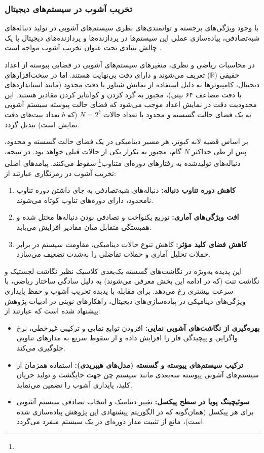 \subsubsection{تخریب آشوب در سیستم‌های دیجیتال}

با وجود ویژگی‌های برجسته و توانمندی‌های نظری سیستم‌های آشوبی در تولید دنباله‌های شبه‌تصادفی، پیاده‌سازی عملی این سیستم‌ها در پردازنده‌ها و پردازنده‌های دیجیتال با یک چالش بنیادی تحت عنوان تخریب آشوب مواجه است \cite{ref5, ref19}. 

در محاسبات ریاضی و نظری، متغیرهای سیستم‌های آشوبی در فضایی پیوسته از اعداد حقیقی ($\mathbb{R}$) تعریف می‌شوند و دارای دقت بی‌نهایت هستند. اما در سخت‌افزارهای دیجیتال، کامپیوترها به دلیل استفاده از نمایش شناور با دقت محدود (مانند استانداردهای  با دقت مضاعف ۶۴ بیتی)، مجبور به گرد کردن و کوانتایز کردن مقادیر هستند. این محدودیت دقت در نمایش اعداد موجب می‌شود که فضای حالت پیوسته سیستم آشوبی به یک فضای حالت گسسته و محدود با تعداد حالات $N=2^b$ (که $b$ تعداد بیت‌های دقت نمایش است) تبدیل گردد.

بر اساس قضیه لانه کبوتر، هر مسیر دینامیکی در یک فضای حالت گسسته و محدود، پس از طی حداکثر $N$ گام، مجبور به تکرار یکی از حالات قبلی خواهد بود. در نتیجه، دنباله‌های تولیدشده به رفتارهای دوره‌ای متناوب\footnote{} سقوط می‌کنند. پیامدهای اصلی تخریب آشوب در رمزنگاری عبارتند از:
\begin{enumerate}
    \item \textbf{کاهش دوره تناوب دنباله:} دنباله‌های شبه‌تصادفی به جای داشتن دوره تناوب نامحدود، دارای دوره‌های تناوب کوتاه می‌شوند.
    \item \textbf{افت ویژگی‌های آماری:} توزیع یکنواخت و تصادفی بودن دنباله‌ها مختل شده و همبستگی متقابل میان مقادیر افزایش می‌یابد.
    \item \textbf{کاهش فضای کلید مؤثر:} کاهش تنوع حالات دینامیکی، مقاومت سیستم در برابر حملات تحلیل آماری و حملات تفاضلی را به‌شدت تضعیف می‌سازد.
\end{enumerate}

این پدیده به‌ویژه در نگاشت‌های گسسته یک‌بعدی کلاسیک نظیر نگاشت لجستیک و نگاشت تنت (که در ادامه این بخش معرفی می‌شوند) به دلیل سادگی ساختار ریاضی، با سرعت بیشتری رخ می‌دهد. برای مقابله با پدیده تخریب آشوب و حفظ پایداری ویژگی‌های دینامیکی در پیاده‌سازی‌های دیجیتال، راهکارهای نوینی در ادبیات پژوهش پیشنهاد شده است که عبارتند از:
\begin{itemize}
    \item \textbf{بهره‌گیری از نگاشت‌های آشوبی نمایی:} افزودن توابع نمایی و ترکیبی غیرخطی، نرخ واگرایی و پیچیدگی فاز را افزایش داده و از سقوط سریع به مدارهای تناوبی جلوگیری می‌کند.
    \item \textbf{ترکیب سیستم‌های پیوسته و گسسته (مدل‌های هیبریدی):} استفاده همزمان از سیستم‌های آشوبی پیوسته سه‌بعدی مانند سیستم چن جهت جایگشت و تولید جریان کلید، پایداری آشوب را تضمین می‌نماید.
    \item \textbf{سوئیچینگ پویا در سطح پیکسل:} تغییر دینامیک و انتخاب تصادفی سیستم آشوبی برای هر پیکسل (همان‌گونه که در الگوریتم پیشنهادی این پژوهش پیاده‌سازی شده است)، مانع از تثبیت مدار دوره‌ای در یک سیستم منفرد می‌گردد.
\end{itemize}


